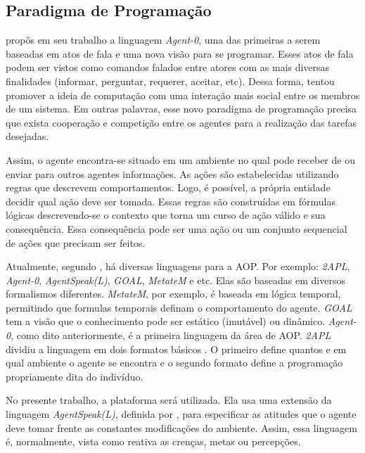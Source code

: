 \subsection{Paradigma de Programação} \label{sec:aoppp}

\citet{shoham1993agent} propôs em seu trabalho a linguagem \emph{Agent-0}, uma
das primeiras a serem baseadas em atos de fala e uma nova visão para se
programar.  Esses atos de fala podem ser vistos como comandos falados entre
atores com as mais diversas finalidades (informar, perguntar, requerer,
aceitar, etc).  Dessa forma,  tentou promover a
ideia de computação com uma interação mais social entre os membros de um sistema.
Em outras palavras, esse novo paradigma de programação precisa que exista
cooperação e competição entre os agentes para a realização das tarefas
desejadas.

Assim, o agente encontra-se situado em um ambiente no qual pode receber de ou
enviar para outros agentes informações. As ações são
estabelecidas utilizando regras que descrevem comportamentos. Logo, é
possível, a própria entidade decidir qual ação deve ser tomada. Essas regras
são construídas em fórmulas lógicas descrevendo-se o contexto que torna um
curso de ação válido e sua consequência. Essa consequência pode ser uma ação
ou um conjunto sequencial de ações que precisam ser feitos.

Atualmente, segundo \citet{bordini2009multi}, há diversas linguagens para a
AOP. Por exemplo: \emph{2APL}, \emph{Agent-0}, \emph{AgentSpeak(L)},
\emph{GOAL}, \emph{MetateM} e etc. Elas são baseadas em diversos
formalismos diferentes. \emph{MetateM}, por exemplo, é baseada em lógica temporal,
permitindo que formulas temporais definam o comportamento do agente.
\emph{GOAL} tem a visão que o conhecimento pode ser estático (imutável) ou
dinâmico. \emph{Agent-0}, como dito anteriormente, é a primeira linguagem da
área de AOP. \emph{2APL} dividiu a linguagem em
dois formatos básicos \cite{dastani20082apl}. O primeiro define quantos e em
qual ambiente o agente se encontra e o segundo formato define a programação
propriamente dita do indivíduo.

No presente trabalho, a plataforma \jason \cite{bordini-jason} será utilizada.
Ela usa uma extensão da linguagem \emph{AgentSpeak(L)}, definida por
\citet{rao1996agentspeak}, para especificar as atitudes que o agente deve
tomar frente as constantes modificações do ambiente. Assim, essa linguagem é,
normalmente, vista como reativa as crenças, metas ou percepções.

